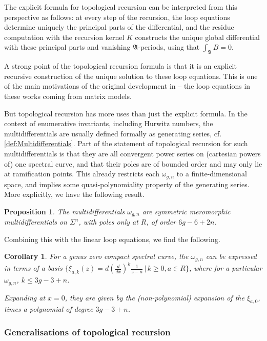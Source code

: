 \documentclass[10pt,a4paper,oneside,no-math,reqno]{amsart}%
\theoremstyle{plain}
\newtheorem{proposition}[theorem]{Proposition}
\newtheorem{corollary}[theorem]{Corollary}
\theoremstyle{definition}
\theoremstyle{remark}
\numberwithin{equation}{section}
\newcommand{\mf}[1]{\mathfrak{#1}}
\newcommand{\1}{\mathds{1}}
\newcommand{\<}{\langle}
\renewcommand{\>}{\rangle}
\begin{document}
The explicit formula for topological recursion can be interpreted from this perspective as follows: at every step of the recursion, the loop equations determine uniquely the principal parts of the differential, and the residue computation with the recursion kernel $K$ constructs the unique global differential with these principal parts and vanishing $ \mf{A}$-periods, using that $ \int_\mf{A} B = 0$.

A  strong point of the topological recursion formula is that it is an explicit recursive construction of the unique solution to these loop equations. This is one of the main motivations of the original development in  \cite{CEO06,EO07} -- the loop equations in these works coming from matrix models.

But topological recursion has more uses than just the explicit formula. In the context of enumerative invariants, including Hurwitz numbers, the multidifferentials are usually defined formally as generating series, cf. \cref{def:Multidifferentials}. Part of the statement of topological recursion for such multidifferentials is that they are all convergent power series on (cartesian powers of) one spectral curve, and that their poles are of bounded order and may only lie at ramification points. This already restricts each $ \omega_{g,n}$ to a finite-dimensional space, and implies some quasi-polynomiality property of the generating series. More explicitly, we have the following result.

\begin{proposition}
    The multidifferentials $ \omega_{g,n}$ are symmetric meromorphic multidifferentials on $ \Sigma^n$, with poles only at $R$, of order $ 6g-6+2n$.
\end{proposition}

Combining this with the linear loop equations, we find the following.

\begin{corollary}
    For a genus zero compact spectral curve, the $ \omega_{g,n}$ can be expressed in terms of a  basis $ \{ \xi_{a,k} (z) = d (\frac{d}{dx})^k \frac{1}{z -a} \, | \, k \geq 0, a \in R\} $, where for a particular $ \omega_{g,n}$, $ k \leq 3g-3+n$.\par
    Expanding at $ x= 0$, they are given by the (non-polynomial) expansion of the $ \xi_{a,0}$, times a polynomial of degree $ 3g-3+n$.
\end{corollary}


\subsubsection{Generalisations of topological recursion}
\end{document}
